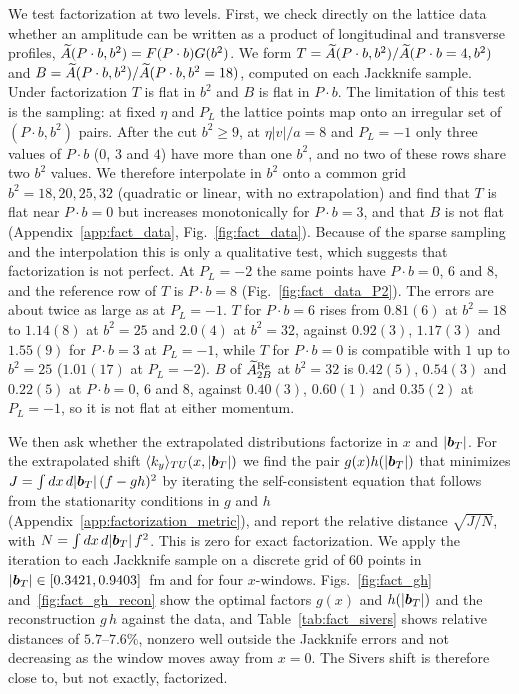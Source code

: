 We test factorization at two levels. First, we check directly on the lattice data whether an amplitude can be written as a product of longitudinal and transverse profiles, $\widetilde{A}(P\cdot b,b^2)=F(P\cdot b)G(b^2)$. We form $T=\widetilde{A}(P\cdot b,b^2)/\widetilde{A}(P\cdot b=4,b^2)$ and $B=\widetilde{A}(P\cdot b,b^2)/\widetilde{A}(P\cdot b,b^2=18)$, computed on each Jackknife sample. Under factorization $T$ is flat in $b^2$ and $B$ is flat in $P\cdot b$. The limitation of this test is the sampling: at fixed $\eta$ and $P_L$ the lattice points map onto an irregular set of $(P\cdot b,b^2)$ pairs. After the cut $b^2\ge9$, at $\eta|v|/a=8$ and $P_L=-1$ only three values of $P\cdot b$ ($0$, $3$ and $4$) have more than one $b^2$, and no two of these rows share two $b^2$ values. We therefore interpolate in $b^2$ onto a common grid $b^2=18,20,25,32$ (quadratic or linear, with no extrapolation) and find that $T$ is flat near $P\cdot b=0$ but increases monotonically for $P\cdot b=3$, and that $B$ is not flat (Appendix~\ref{app:fact_data}, Fig.~\ref{fig:fact_data}). Because of the sparse sampling and the interpolation this is only a qualitative test, which suggests that factorization is not perfect. At $P_L=-2$ the same points have $P\cdot b=0$, $6$ and $8$, and the reference row of $T$ is $P\cdot b=8$ (Fig.~\ref{fig:fact_data_P2}). The errors are about twice as large as at $P_L=-1$. $T$ for $P\cdot b=6$ rises from $0.81(6)$ at $b^2=18$ to $1.14(8)$ at $b^2=25$ and $2.0(4)$ at $b^2=32$, against $0.92(3)$, $1.17(3)$ and $1.55(9)$ for $P\cdot b=3$ at $P_L=-1$, while $T$ for $P\cdot b=0$ is compatible with $1$ up to $b^2=25$ ($1.01(17)$ at $P_L=-2$). $B$ of $\widetilde{A}_{2B}^{\text{Re}}$ at $b^2=32$ is $0.42(5)$, $0.54(3)$ and $0.22(5)$ at $P\cdot b=0$, $6$ and $8$, against $0.40(3)$, $0.60(1)$ and $0.35(2)$ at $P_L=-1$, so it is not flat at either momentum.

We then ask whether the extrapolated distributions factorize in $x$ and $|\boldsymbol{b}_T|$. For the extrapolated shift $\langle k_y\rangle_{TU}(x,|\boldsymbol{b}_T|)$ we find the pair $g(x)h(|\boldsymbol{b}_T|)$ that minimizes $J=\int dx\,d|\boldsymbol{b}_T|\,(f-gh)^2$ by iterating the self-consistent equation that follows from the stationarity conditions in $g$ and $h$ (Appendix~\ref{app:factorization_metric}), and report the relative distance $\sqrt{J/N}$, with $N=\int dx\,d|\boldsymbol{b}_T|\,f^2$. This is zero for exact factorization. We apply the iteration to each Jackknife sample on a discrete grid of $60$ points in $|\boldsymbol{b}_T|\in[0.3421,0.9403]$~fm and for four $x$-windows. Figs.~\ref{fig:fact_gh} and~\ref{fig:fact_gh_recon} show the optimal factors $g(x)$ and $h(|\boldsymbol{b}_T|)$ and the reconstruction $g\,h$ against the data, and Table~\ref{tab:fact_sivers} shows relative distances of $5.7$--$7.6\%$, nonzero well outside the Jackknife errors and not decreasing as the window moves away from $x=0$. The Sivers shift is therefore close to, but not exactly, factorized.

